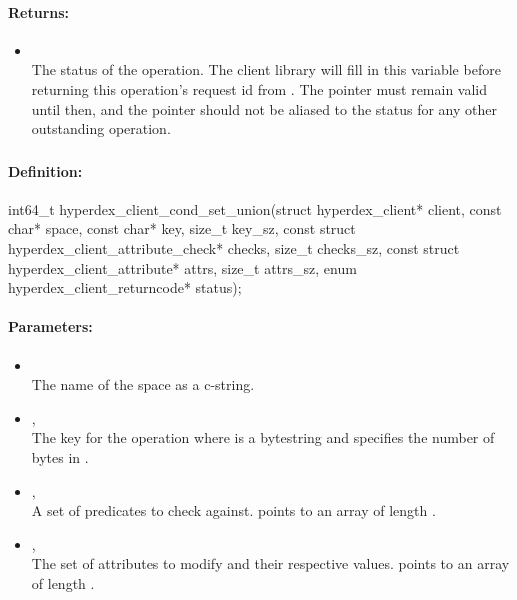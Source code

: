 \paragraph{Returns:}
\begin{itemize}[noitemsep]
\item {}\\
The status of the operation.  The client library will fill in this variable before returning this operation's request id from .  The pointer must remain valid until then, and the pointer should not be aliased to the status for any other outstanding operation.
\end{itemize}

\pagebreak
\subsubsection{}
\label{api:c:cond_set_union}


\paragraph{Definition:}
\begin{ccode}
int64_t hyperdex_client_cond_set_union(struct hyperdex_client* client,
        const char* space,
        const char* key, size_t key_sz,
        const struct hyperdex_client_attribute_check* checks, size_t checks_sz,
        const struct hyperdex_client_attribute* attrs, size_t attrs_sz,
        enum hyperdex_client_returncode* status);
\end{ccode}

\paragraph{Parameters:}
\begin{itemize}[noitemsep]
\item {}\\
The name of the space as a c-string.
\item {}, \\
The key for the operation where  is a bytestring and  specifies the number of bytes in .
\item {}, \\
A set of predicates to check against.   points to an array of length .
\item {}, \\
The set of attributes to modify and their respective values.   points to an array of length .
\end{itemize}

